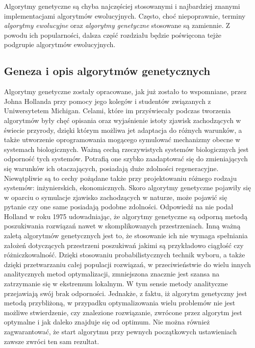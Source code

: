 Algorytmy genetyczne są chyba najczęściej stosowanymi i najbardziej znanymi implementacjami algorytmów ewolucyjnych. Często, choć niepoprawnie, terminy \textit{algorytmy ewolucyjne} oraz \textit{algorytmy genetyczne} stosowane są zamiennie. Z powodu ich popularności, dalsza część rozdziału będzie poświęcona tejże podgrupie algorytmów ewolucyjnych.

\subsection{Geneza i opis algorytmów genetycznych}
Algorytmy genetyczne zostały opracowane, jak już zostało to wspomniane, przez Johna Hollanda przy pomocy jego kolegów i studentów związanych z Uniwersytetem Michigan. Celami, które im przyświecały podczas tworzenia algorytmów były chęć opisania oraz wyjaśnienie istoty zjawisk zachodzących w świecie przyrody, dzięki którym możliwa jet adaptacja do różnych warunków, a także utworzenie oprogramowania mogącego symulować mechanizmy obecne w systemach biologicznych. Ważną cechą rzeczywistych systemów biologicznych jest odporność tych systemów. Potrafią one szybko zaadaptować się do zmieniających się warunków ich otaczających, posiadają duże zdolności regeneracyjne. Niewątpliwie są to cechy pożądane także przy projektowaniu różnego rodzaju systemów: inżynierskich, ekonomicznych. Skoro algorytmy genetyczne pojawiły się w oparciu o symulacje zjawisko zachodzących w naturze, może pojawić się pytanie czy one same posiadają podobne zdolności. Odpowiedź na nie podał Holland w roku 1975 udowadniając, że algorytmy genetyczne są odporną metodą poszukiwania rozwiązań nawet w skomplikowanych przestrzeniach. Inną ważną zaletą algorytmów genetycznych jest to, że stosowanie ich nie wymaga spełniania założeń dotyczących przestrzeni poszukiwań jakimi są przykładowo ciągłość czy różniczkowalność. Dzięki stosowaniu probabilistycznych technik wyboru, a także dzięki przetwarzaniu całej populacji rozwiązań, w przeciwieństwie do wielu innych analitycznych metod optymalizacji, zmniejszona znacznie jest szansa na zatrzymanie się w ekstremum lokalnym. W tym sensie metody analityczne przejawiają swój brak odporności.
Jednakże, z faktu, iż algorytm genetyczny jest metodą przybliżoną, w przypadku optymalizowania wielu problemów nie jest możliwe stwierdzenie, czy znalezione rozwiązanie, zwrócone przez algorytm jest optymalne i jak daleko znajduje się od optimum. Nie można również zagwarantować, że start algorytmu przy pewnych początkowych ustawieniach zawsze zwróci ten sam rezultat.

